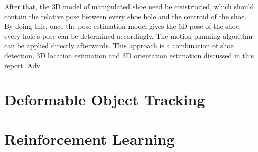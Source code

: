 After that, the 3D model of manipulated shoe need be constructed, which should contain the relative pose between every shoe hole and the centroid of the shoe. By doing this, once the pose estimation model gives the 6D pose of the shoe, every hole's pose can be determined accordingly. The motion planning algorithm can be applied directly afterwards. This approach is a combination of shoe detection, 3D location estimation and 3D orientation estimation discussed in this report. Adv

\section{Deformable Object Tracking}


\section{Reinforcement Learning}